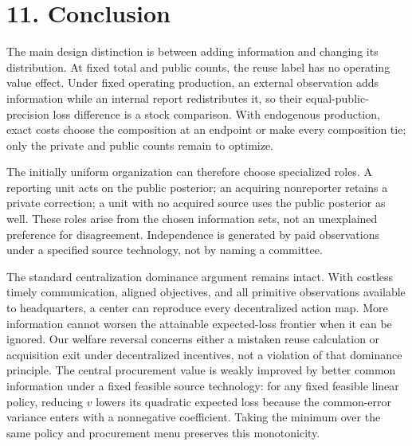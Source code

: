 \documentclass[
  11pt,
]{article}
\begin{document}
\section{11. Conclusion}\label{interpretation-and-remaining-scientific-limits}

The main design distinction is between adding information and changing
its distribution. At fixed total and public counts, the reuse label has
no operating value effect. Under fixed operating production, an external
observation adds information while an internal report redistributes it,
so their equal-public-precision loss difference is a stock comparison.
With endogenous production, exact costs choose the composition at an
endpoint or make every composition tie; only the private and public
counts remain to optimize.

The initially uniform organization can therefore choose specialized
roles. A reporting unit acts on the public posterior; an acquiring
nonreporter retains a private correction; a unit with no acquired source
uses the public posterior as well. These roles arise from the chosen
information sets, not an unexplained preference for disagreement.
Independence is generated by paid observations under a specified source
technology, not by naming a committee.

The standard centralization dominance argument remains intact. With
costless timely communication, aligned objectives, and all primitive
observations available to headquarters, a center can reproduce every
decentralized action map. More information cannot worsen the attainable
expected-loss frontier when it can be ignored. Our welfare reversal
concerns either a mistaken reuse calculation or acquisition exit under
decentralized incentives, not a violation of that dominance principle.
The central procurement value is weakly improved by better common
information under a fixed feasible source technology: for any fixed
feasible linear policy, reducing \(v\) lowers its quadratic expected
loss because the common-error variance enters with a nonnegative
coefficient. Taking the minimum over the same policy and procurement
menu preserves this monotonicity.
\end{document}
